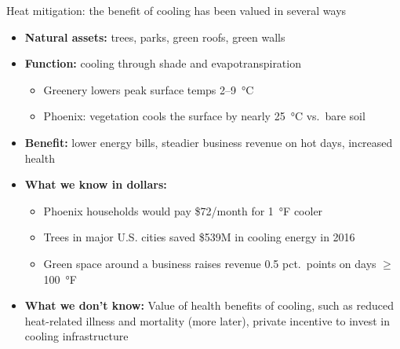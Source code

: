 \documentclass[aspectratio=169]{beamer}
\newcommand{\smallcite}[1]{\begingroup\scriptsize\citep{#1}\endgroup}
\begin{document}
\begin{frame}{Heat mitigation: the benefit of cooling has been valued in several ways}
    \small
    \begin{itemize}
        \item \textbf{Natural assets:} trees, parks, green roofs, green walls
        \item \textbf{Function:} cooling through shade and evapotranspiration \smallcite{mohajeraniUrbanHeatIsland2017,wongGreeneryMitigationAdaptation2021}
        \begin{itemize}
            \item Greenery lowers peak surface temps 2--9~°C \smallcite{wongGreeneryMitigationAdaptation2021}
            \item Phoenix: vegetation cools the surface by nearly 25~°C vs.\ bare soil \smallcite{jenerette_ecosystem_2011}
        \end{itemize}
        \item \textbf{Benefit:} lower energy bills, steadier business revenue on hot days, increased health
        \item \textbf{What we know in dollars:}
        \begin{itemize}
            \item Phoenix households would pay \$72/month for 1~°F cooler \smallcite{klaiberItLessHot2017}
            \item Trees in major U.S. cities saved \$539M in cooling energy in 2016 \smallcite{herisPilotingUrbanEcosystem2021}
            \item Green space around a business raises revenue 0.5 pct.\ points on days $\geq$100~°F \smallcite{creelValueNatureBasedAdaptation2026}
        \end{itemize}
        \item \textbf{What we don't know:} Value of health benefits of cooling, such as reduced heat-related illness and mortality (more later), private incentive to invest in cooling infrastructure
    \end{itemize}
\end{frame}
\end{document}
